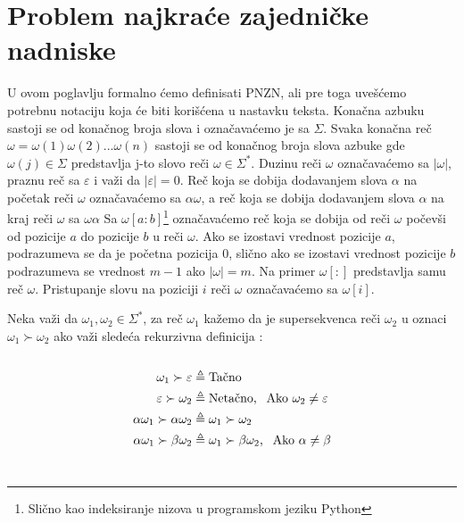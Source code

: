 \documentclass[12pt,oneside]{memoir}
\begin{document}
\section{Problem najkraće zajedničke nadniske}
U ovom poglavlju formalno ćemo definisati PNZN, ali pre toga uvešćemo potrebnu notaciju koja će biti korišćena u nastavku
teksta. Konačna azbuku sastoji se od konačnog broja slova i označavaćemo je sa $\Sigma$. Svaka konačna reč
$\omega=\omega(1)\omega(2)...\omega(n)$ sastoji se od konačnog broja slova azbuke gde $\omega(j)\in\Sigma$ predstavlja j-to slovo reči $\omega\in\Sigma^*$.
Duzinu reči $\omega$ označavaćemo sa $|\omega|$, praznu reč sa $\varepsilon$ i važi da $|\varepsilon|=0$. 
Reč koja se dobija dodavanjem
slova $\alpha$ na početak reči $\omega$ označavaćemo sa $\alpha\omega$,
a reč koja se dobija dodavanjem slova $\alpha$ na kraj reči $\omega$ sa $\omega\alpha$
Sa $\omega[a:b]$\footnote{Slično kao indeksiranje nizova u programskom jeziku Python} označavaćemo reč koja se dobija od
reči $\omega$ počevši od pozicije $a$ do pozicije $b$ u reči $\omega$. Ako se izostavi vrednost pozicije $a$, podrazumeva se
da je početna pozicija 0, slično ako se izostavi vrednost pozicije $b$ podrazumeva se vrednost $m-1$ ako $|\omega|=m$.
Na primer $\omega[:]$ predstavlja samu reč $\omega$. Pristupanje slovu na poziciji $i$ reči $\omega$ 
označavaćemo sa $\omega[i]$.

Neka važi da $\omega_{1},\omega_{2}\in\Sigma^*$, za reč $\omega_{1}$ kažemo da je
supersekvenca reči $\omega_{2}$ u oznaci $\omega_{1}\succ\omega_{2}$ ako važi sledeća rekurzivna definicija \cite{ProbabilisticBS}:
\\
\\
\begin{equation}
\begin{aligned}
\omega_{1}\succ\varepsilon &\triangleq \textrm{Tačno}\\
\varepsilon\succ\omega_{2} &\triangleq \textrm{Netačno, \:\:Ako } \omega_{2}\neq\varepsilon\\
\alpha\omega_{1}\succ\alpha\omega_{2} &\triangleq \omega_{1}\succ\omega_{2}\\
\alpha\omega_{1}\succ\beta\omega_{2} &\triangleq \omega_{1}\succ\beta\omega_{2} \textrm{, \:\:Ako } \alpha\neq\beta
\end{aligned}
\end{equation}
\\
\end{document}
